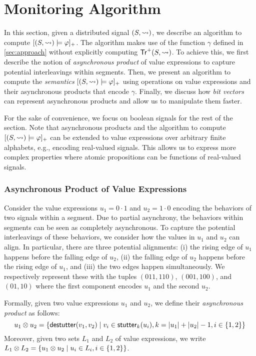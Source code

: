 \section{Monitoring Algorithm} \label{sec:algorithm}
In this section, given a distributed signal $(S,{\rightsquigarrow})$, we describe an algorithm to compute $[(S,{\rightsquigarrow}) \models \varphi]_+$.
The algorithm makes use of the function $\gamma$ defined in \cref{sec:approach} without explicitly computing $\mathsf{Tr}^+(S,{\rightsquigarrow})$.
To achieve this, we first describe the notion of \emph{asynchronous product} of value expressions to capture potential interleavings within segments.
Then, we present an algorithm to compute the \emph{semantics} $[(S,{\rightsquigarrow}) \models \varphi]_+$ using operations on value expressions and their asynchronous products that encode $\gamma$. 
Finally, we discuss how \emph{bit vectors} can represent asynchronous products and allow us to manipulate them faster.

\begin{remark}
	For the sake of convenience, we focus on boolean signals for the rest of the section.
	Note that asynchronous products and the algorithm to compute $[(S,{\rightsquigarrow}) \models \varphi]_+$ can be extended to value expressions over arbitrary finite alphabets, e.g., encoding real-valued signals.
	This allows us to express more complex properties where atomic propositions can be functions of real-valued signals.
\end{remark}

\subsubsection{Asynchronous Product of Value Expressions}
Consider the value expressions $u_1 = 0 \cdot 1$ and $u_2 = 1 \cdot 0$ encoding the behaviors of two signals within a segment.
Due to partial asynchrony, the behaviors within segments can be seen as completely asynchronous.
To capture the potential interleavings of these behaviors, we consider how the values in $u_1$ and $u_2$ can align.
In particular, there are three potential alignments:
(i) the rising edge of $u_1$ happens before the falling edge of $u_2$,
(ii) the falling edge of $u_2$ happens before the rising edge of $u_1$, and
(iii) the two edges happen simultaneously.
We respectively represent these with the tuples $(011, 110)$, $(001, 100)$, and $(01, 10)$ where the first component encodes $u_1$ and the second $u_2$.

Formally, given two value expressions $u_1$ and $u_2$, we define their \emph{asynchronous product} as follows:
\small
$$u_1 \otimes u_2 = \{ \destutter(v_1, v_2) \st v_i \in \stutter_k(u_i), k = |u_1| + |u_2| - 1, i \in \{1,2\} \}$$  
\normalsize
Moreover, given two sets $L_1$ and $L_2$ of value expressions, we write $L_1 \otimes L_2 = \{ u_1 \otimes u_2 \st u_i \in L_i, i \in \{1,2\} \}$.

